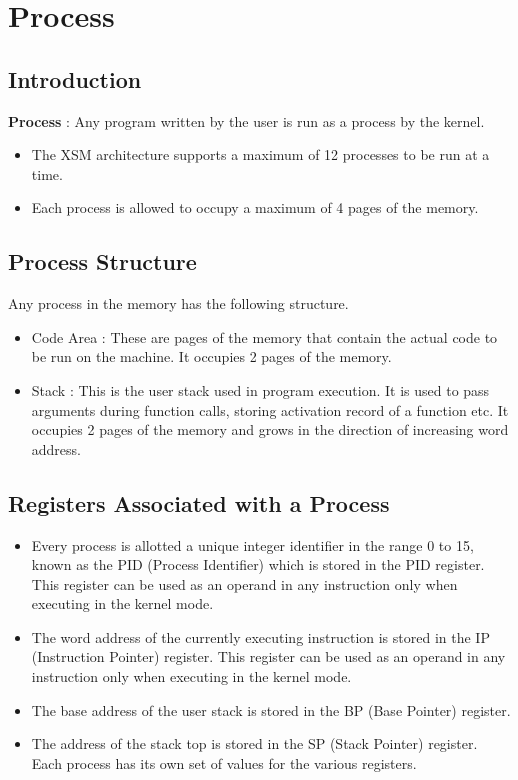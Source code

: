 \documentclass[11pt]{article}
\begin{document}
\pagebreak

\section{Process}

\subsection{Introduction}
\textbf{Process} : Any program written by the user is run as a process by the kernel.
\begin{itemize}
\item The XSM architecture supports a maximum of 12 processes to be run at a time.
\item Each process is allowed to occupy a maximum of 4 pages of the memory.
\end{itemize}

\subsection{Process Structure}
Any process in the memory has the following structure.
\begin{itemize}
\item Code Area : These are pages of the memory that contain the actual code to be run on the machine. It occupies 2 pages of the memory.
\item Stack : This is the user stack used in program execution. It is used to pass arguments during function calls, storing activation record of a function etc. It occupies 2 pages of the memory and grows in the direction of increasing word address.
\end{itemize}

\subsection{Registers Associated with a Process}

\begin{itemize}
\item Every process is allotted a unique integer identifier in the range 0 to 15, known as the PID (Process Identifier) which is stored in the PID register. This register can be used as an operand in any instruction only when executing in the kernel mode.
\item The word address of the currently executing instruction is stored in the IP (Instruction Pointer) register. This register can be used as an operand in any instruction only when executing in the kernel mode.
\item The base address of the user stack is stored in the BP (Base Pointer) register.
\item The address of the stack top is stored in the SP (Stack Pointer) register. Each process has its own set of values for the various registers.
\end{itemize}
\end{document}
